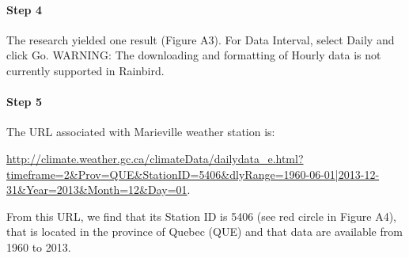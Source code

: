\documentclass[12pt, letterpaper, fleqn]{report}
\begin{document}
\paragraph{Step 4} The research yielded one result (Figure A3). For Data Interval, select Daily and click Go.
	WARNING: The downloading and formatting of Hourly data is not currently supported in Rainbird.

\paragraph{Step 5} The URL associated with Marieville weather station is:\\[0.1cm]

\begin{sloppypar}
\noindent
\url{http://climate.weather.gc.ca/climateData/dailydata_e.html?timeframe=2&Prov=QUE&StationID=5406&dlyRange=1960-06-01|2013-12-31&Year=2013&Month=12&Day=01}.\\[0.1cm]
\end{sloppypar}

From this URL, we find that its Station ID is 5406 (see red circle in Figure A4), that is located in the province of Quebec (QUE) and that data are available from 1960 to 2013.
\end{document}
